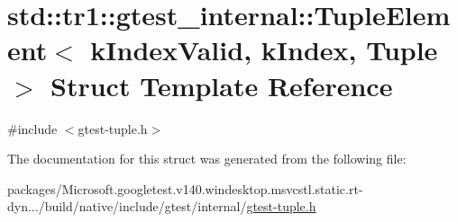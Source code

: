 \hypertarget{structstd_1_1tr1_1_1gtest__internal_1_1_tuple_element}{}\section{std\+::tr1\+::gtest\+\_\+internal\+::Tuple\+Element$<$ k\+Index\+Valid, k\+Index, Tuple $>$ Struct Template Reference}
\label{structstd_1_1tr1_1_1gtest__internal_1_1_tuple_element}


{\ttfamily \#include $<$gtest-\/tuple.\+h$>$}



The documentation for this struct was generated from the following file\+:\begin{DoxyCompactItemize}
\item 
packages/\+Microsoft.\+googletest.\+v140.\+windesktop.\+msvcstl.\+static.\+rt-\/dyn.../build/native/include/gtest/internal/\mbox{\hyperlink{gtest-tuple_8h}{gtest-\/tuple.\+h}}\end{DoxyCompactItemize}
